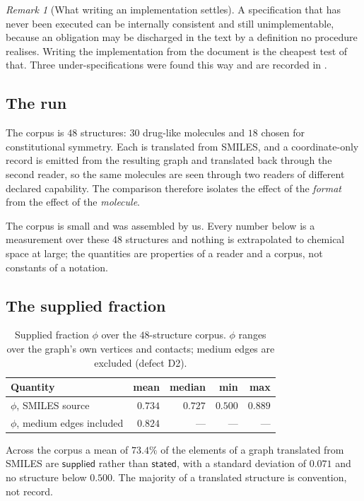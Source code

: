 \documentclass[11pt,twocolumn,a4paper]{article}
\theoremstyle{msthm}
\theoremstyle{definition}
\theoremstyle{remark}
\newtheorem{remark}[theorem]{Remark}
\newcommand{\stated}{\textsf{stated}}
\newcommand{\supplied}{\textsf{supplied}}
\begin{document}
\begin{remark}[What writing an implementation settles]
\label{rem:refimpl}
A specification that has never been executed can be internally
consistent and still unimplementable, because an obligation may be
discharged in the text by a definition no procedure realises. Writing
the implementation from the document is the cheapest test of that. Three
under-specifications were found this way and are recorded in
.
\end{remark}

\subsection{The run}

The corpus is $48$ structures: $30$ drug-like molecules and $18$ chosen
for constitutional symmetry. Each is translated from SMILES, and a
coordinate-only record is emitted from the resulting graph and
translated back through the second reader, so the same molecules are
seen through two readers of different declared capability. The
comparison therefore isolates the effect of the \emph{format} from the
effect of the \emph{molecule}.

The corpus is small and was assembled by us. Every number below is a
measurement over these $48$ structures and nothing is extrapolated to
chemical space at large; the quantities are properties of a reader and a
corpus, not constants of a notation.

\subsection{The supplied fraction}

\begin{table}[htbp]
\centering\small
\caption{Supplied fraction $\phi$ over the $48$-structure corpus.
$\phi$ ranges over the graph's own vertices and contacts; medium edges
are excluded (defect D2).}
\label{tab:phi}
\begin{tabular}{@{}lrrrr@{}}
\toprule
Quantity & mean & median & min & max\\
\midrule
$\phi$, SMILES source & $0.734$ & $0.727$ & $0.500$ & $0.889$\\
$\phi$, medium edges included & $0.824$ & --- & --- & ---\\
\bottomrule
\end{tabular}
\end{table}

Across the corpus a mean of $73.4\%$ of the elements of a graph
translated from SMILES are $\supplied$ rather than $\stated$, with a
standard deviation of $0.071$ and no structure below $0.500$. The
majority of a translated structure is convention, not record.
\end{document}

